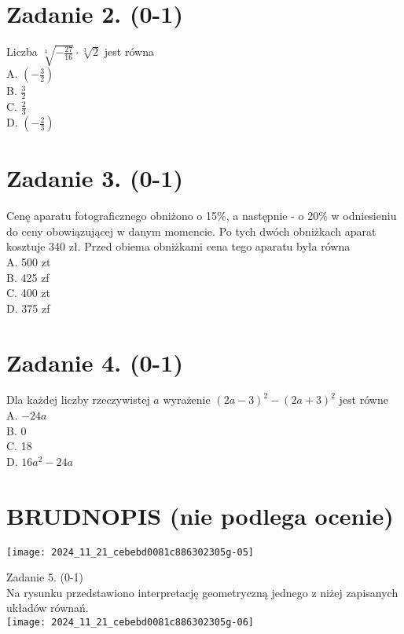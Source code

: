\documentclass[10pt]{article}
\begin{document}
\section*{Zadanie 2. (0-1)}
Liczba \(\sqrt[3]{-\frac{27}{16}} \cdot \sqrt[3]{2}\) jest równa\\
A. \(\left(-\frac{3}{2}\right)\)\\
B. \(\frac{3}{2}\)\\
C. \(\frac{2}{3}\)\\
D. \(\left(-\frac{2}{3}\right)\)

\section*{Zadanie 3. (0-1)}
Cenę aparatu fotograficznego obniżono o 15\%, a następnie - o 20\% w odniesieniu do ceny obowiązującej w danym momencie. Po tych dwóch obniżkach aparat kosztuje 340 zł. Przed obiema obniżkami cena tego aparatu była równa\\
A. 500 zt\\
B. 425 zf\\
C. 400 zt\\
D. 375 zf

\section*{Zadanie 4. (0-1)}
Dla każdej liczby rzeczywistej \(a\) wyrażenie \((2 a-3)^{2}-(2 a+3)^{2}\) jest równe\\
A. \(-24 a\)\\
B. 0\\
C. 18\\
D. \(16 a^{2}-24 a\)

\section*{BRUDNOPIS (nie podlega ocenie)}
\begin{center}
\texttt{[image: 2024\_11\_21\_cebebd0081c886302305g-05]}
\end{center}

Zadanie 5. (0-1)\\
Na rysunku przedstawiono interpretację geometryczną jednego z niżej zapisanych układów równań.\\
\texttt{[image: 2024\_11\_21\_cebebd0081c886302305g-06]}
\end{document}
